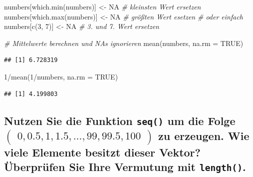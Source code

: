 \documentclass[12pt,a4paper]{article}
\newenvironment{Shaded}{\begin{snugshade}}{\end{snugshade}}
\newcommand{\AttributeTok}[1]{\textcolor[rgb]{0.77,0.63,0.00}{#1}}
\newcommand{\CommentTok}[1]{\textcolor[rgb]{0.56,0.35,0.01}{\textit{#1}}}
\newcommand{\ConstantTok}[1]{\textcolor[rgb]{0.00,0.00,0.00}{#1}}
\newcommand{\DecValTok}[1]{\textcolor[rgb]{0.00,0.00,0.81}{#1}}
\newcommand{\FunctionTok}[1]{\textcolor[rgb]{0.00,0.00,0.00}{#1}}
\newcommand{\NormalTok}[1]{#1}
\newcommand{\OtherTok}[1]{\textcolor[rgb]{0.56,0.35,0.01}{#1}}
\newcommand{\SpecialCharTok}[1]{\textcolor[rgb]{0.00,0.00,0.00}{#1}}
\begin{document}
\begin{Shaded}
\begin{Highlighting}[]
\NormalTok{    numbers[}\FunctionTok{which.min}\NormalTok{(numbers)] }\OtherTok{\textless{}{-}} \ConstantTok{NA}     \CommentTok{\# kleinsten Wert ersetzen}
\NormalTok{    numbers[}\FunctionTok{which.max}\NormalTok{(numbers)] }\OtherTok{\textless{}{-}} \ConstantTok{NA}     \CommentTok{\# größten Wert esetzen }
    \CommentTok{\# oder einfach }
\NormalTok{    numbers[}\FunctionTok{c}\NormalTok{(}\DecValTok{3}\NormalTok{, }\DecValTok{7}\NormalTok{)] }\OtherTok{\textless{}{-}} \ConstantTok{NA}                \CommentTok{\# 3. und 7. Wert ersetzen }
    
    \CommentTok{\# Mittelwerte berechnen und \textquotesingle{}NA\textquotesingle{}s ignorieren}
    \FunctionTok{mean}\NormalTok{(numbers, }\AttributeTok{na.rm =} \ConstantTok{TRUE}\NormalTok{)}
\end{Highlighting}
\end{Shaded}

\begin{verbatim}
## [1] 6.728319
\end{verbatim}

\begin{Shaded}
\begin{Highlighting}[]
    \DecValTok{1}\SpecialCharTok{/}\FunctionTok{mean}\NormalTok{(}\DecValTok{1}\SpecialCharTok{/}\NormalTok{numbers, }\AttributeTok{na.rm =} \ConstantTok{TRUE}\NormalTok{)}
\end{Highlighting}
\end{Shaded}

\begin{verbatim}
## [1] 4.199803
\end{verbatim}

\vspace{0.5cm}

\hypertarget{nutzen-sie-die-funktion-um-die-folge-beginpmatrix-0-0.5-1-1.5-ldots-99-99.5-100-endpmatrix-zu-erzeugen.-wie-viele-elemente-besitzt-dieser-vektor-uxfcberpruxfcfen-sie-ihre-vermutung-mit-.}{%
\subsection{\texorpdfstring{Nutzen Sie die Funktion \texttt{seq()} um
die Folge
\linebreak \(\begin{pmatrix} 0, 0.5, 1, 1.5, \ldots, 99, 99.5, 100 \end{pmatrix}\)
zu erzeugen. Wie viele Elemente besitzt dieser Vektor? Überprüfen Sie
Ihre Vermutung mit
\texttt{length()}.}{Nutzen Sie die Funktion  um die Folge \textbackslash begin\{pmatrix\} 0, 0.5, 1, 1.5, \textbackslash ldots, 99, 99.5, 100 \textbackslash end\{pmatrix\} zu erzeugen. Wie viele Elemente besitzt dieser Vektor? Überprüfen Sie Ihre Vermutung mit .}}\label{nutzen-sie-die-funktion-um-die-folge-beginpmatrix-0-0.5-1-1.5-ldots-99-99.5-100-endpmatrix-zu-erzeugen.-wie-viele-elemente-besitzt-dieser-vektor-uxfcberpruxfcfen-sie-ihre-vermutung-mit-.}}
\end{document}
